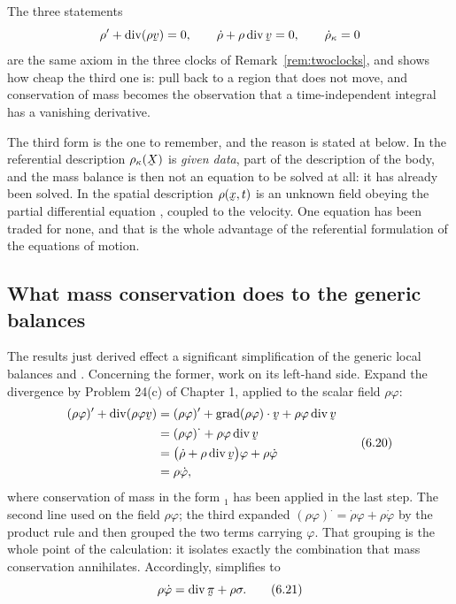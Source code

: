 \begin{remark}\label{rem:ch6massforms}
The three statements
\[
   \rho'+\dvg(\rho\bv)=0,\qquad
   \dot\rho+\rho\dvg\bv=0,\qquad
   \dot\rho_{\kappa}=0
\]
are the same axiom in the three clocks of Remark~\ref{rem:twoclocks},
and  shows how cheap the third one is: pull back to a region
that does not move, and conservation of mass becomes the observation
that a time-independent integral has a vanishing derivative.

The third form is the one to remember, and the reason is stated at
 below. In the referential description $\rho_{\kappa}(\bX)$
is \emph{given data}, part of the description of the body, and the mass
balance is then not an equation to be solved at all: it has already
been solved. In the spatial description $\rho(\bx,t)$ is an unknown
field obeying the partial differential equation , coupled to
the velocity. One equation has been traded for none, and that is the
whole advantage of the referential formulation of the equations of
motion.
\end{remark}

\subsection*{What mass conservation does to the generic balances}

The results just derived effect a significant simplification of the
generic local balances  and . Concerning the former,
work on its left-hand side. Expand the divergence by Problem 24(c) of
Chapter 1, applied to the scalar field $\rho\varphi$:
\begin{equation}
\begin{aligned}
   (\rho\varphi)'+\dvg(\rho\varphi\bv)
   &=(\rho\varphi)'+\ip{\grad(\rho\varphi)}\bv+\rho\varphi\dvg\bv\\
   &=(\rho\varphi)^{\textstyle\cdot}+\rho\varphi\dvg\bv\\
   &=\big(\dot\rho+\rho\dvg\bv\big)\varphi+\rho\dot\varphi\\
   &=\rho\dot\varphi ,
\end{aligned}
   \tag{6.20}\label{eq:6.20}
\end{equation}
where conservation of mass in the form $_{1}$ has been
applied in the last step. The second line used  on the field
$\rho\varphi$; the third expanded
$(\rho\varphi)^{\textstyle\cdot}=\dot\rho\varphi+\rho\dot\varphi$ by
the product rule and then grouped the two terms carrying $\varphi$.
That grouping is the whole point of the calculation: it isolates
exactly the combination that mass conservation annihilates.
Accordingly,  simplifies to
\begin{equation}
   \rho\dot\varphi=\dvg\vek\pi+\rho\sigma .
   \tag{6.21}\label{eq:6.21}
\end{equation}

